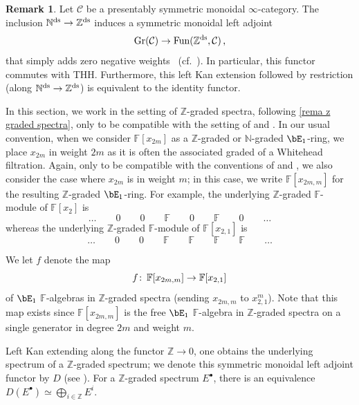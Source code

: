 \documentclass[english,10pt]{amsart}
\newcommand{\field}{\mathbb{F}}
\theoremstyle{definition}
\newtheorem{rema}{Remark}[section]
\numberwithin{equation}{section}
\newcommand{\z}{\mathbb{Z}}
\newcommand{\N}{\mathbb{N}}
\def\co{\colon\thinspace}
\newcommand{\Gr}{\textup{Gr}}
\begin{document}
\begin{rema}\label{rema z graded spectra}
Let $\mathcal{C}$ be a presentably symmetric monoidal $\infty$-category. The inclusion $\mathbb{N}^\textup{ds} \to \mathbb{Z}^{\textup{ds}}$ induces a symmetric monoidal left adjoint 
\begin{equation}\label{eq: adjoint N to Z graded}
\Gr(\mathcal{C}) \to \textup{Fun}(\mathbb{Z}^{\textup{ds}}, \mathcal{C}) \,,
\end{equation}
that simply adds zero negative weights~\cite[Corollary 3.8]{nikolaus2016stablemultyoneda} (cf.~\cite[Proposition~2.12]{Kee25}). In particular, this functor commutes with THH. Furthermore, this left Kan extension followed by restriction (along   $\mathbb{N}^\textup{ds} \to \mathbb{Z}^{\textup{ds}}$) is equivalent to the identity functor.
\end{rema}

In this section, we work in the setting of $\z$-graded spectra, following \autoref{rema z graded spectra}, only to be compatible with the setting of \cite{bayindir2020kthryofthh} and \cite{ausoni2022adjroot}. In our usual convention, when we consider $\field[x_{2m}]$ as a $\z$-graded or $\N$-graded $\bE_1$-ring, we place $x_{2m}$ in weight $2m$ as it is often the associated graded of a Whitehead filtration.  Again, only to be compatible with the conventions of  \cite{bayindir2020kthryofthh} and \cite{ausoni2022adjroot}, we also consider the case where $x_{2m}$ is in weight $m$; in this case, we write $\field[x_{2m,m}]$ for the resulting $\z$-graded $\bE_1$-ring. For example, the underlying $\mathbb{Z}$-graded $\field$-module of $\field[x_{2}]$ is
\[  \dots  \qquad  0 \qquad 0 \qquad \field  \qquad 0  \qquad  \field  \qquad 0  \qquad \dots 
\]
whereas the underlying $\mathbb{Z}$-graded $\field$-module of $\field[x_{2,1}]$ is 
\[  \dots \qquad 0 \qquad  0 \qquad \field  \qquad  \field   \qquad  \field \qquad \field \qquad \dots 
\]

We let $f$ denote the map 
\begin{equation}\label{inclusion map}
f\co \field[x_{2m,m}] \to \field[x_{2,1}]
\end{equation}
of $\bE_1$ $\field$-algebras in $\z$-graded spectra  (sending $x_{2m,m}$ to $x_{2,1}^m$). Note that this map exists since $\field[x_{2m,m}]$ is the free $\bE_1$ $\field$-algebra in $\z$-graded spectra on a single generator in degree $2m$ and weight $m$.

Left Kan extending along the functor $\z\to 0$, one obtains the underlying spectrum of a $\z$-graded spectrum; we denote this symmetric monoidal left adjoint functor by $D$ (see \cite[Section 2.2]{ausoni2022adjroot}). For a $\z$-graded spectrum $E^\bullet$, there is an equivalence $D(E^\bullet) \simeq \bigoplus_{i \in \z} E^i$. 
\end{document}
